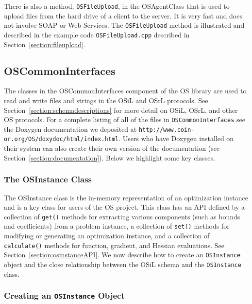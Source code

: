 \documentclass[11pt]{article}
\renewcommand{\_}{{\char"5F}}
\renewcommand{\{}{{\char"7B}}
\renewcommand{\}}{{\char"7D}}
\renewcommand{\^}{{\char"0D}}
\renewcommand{\'}{{\char"0D}}
\begin{document}
\begin{enumerate}[Step 1:]
There is also a method, {\tt OSFileUpload}, in the OSAgentClass that is used to upload files from the hard drive of a client to the server. It is very fast and does not involve SOAP or Web Services. The {\tt OSFileUpload}  method is illustrated and described in the example code {\tt OSFileUpload.cpp} described in Section~\ref{section:fileupload}.

\subsection{OSCommonInterfaces}

The classes in the OSCommonInterfaces component of the OS library are used to read and write files and strings 
in the OSiL and OSrL protocols. See Section~\ref{section:schemadescriptions} for more detail on OSiL, OSrL, 
and other OS protocols. For a complete listing of all of the files in {\tt OSCommonInterfaces} see the Doxygen 
documentation we deposited at {\tt http://www.coin-or.org/OS/doxydoc/html/index.html}. Users who have Doxygen installed on their system
can also create their own version of the documentation (see Section~\ref{section:documentation}). Below we highlight some key classes.





\subsubsection{The OSInstance Class}\label{section:osinstanceclass}

The OSInstance class is the in-memory representation of an optimization instance and is a key 
class for users of the OS project. This class has an API defined by a collection of {\tt get()} methods for 
extracting various components (such as bounds and coefficients) from a problem instance, a collection of 
{\tt set()} methods for modifying or generating an optimization instance, and a collection of {\tt calculate()} 
methods for function, gradient, and Hessian evaluations.  See Section~\ref{section:osinstanceAPI}.  
We now describe how to create an {\tt OSInstance} object and the close relationship between the OSiL schema 
and the {\tt OSInstance} class.

\subsubsection{Creating an {\tt OSInstance} Object}


\end{enumerate}
\end{document}
